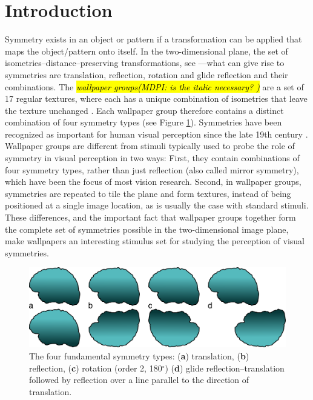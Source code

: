 \documentclass[symmetry,article,accept,pdftex,moreauthors]{Definitions/mdpi}
\begin{document}
\section{Introduction}
Symmetry exists in an object or pattern if a transformation can be applied that maps the object/pattern onto itself. In the two-dimensional plane, the set of isometries--distance--preserving transformations, see \citep{RN1425}---what can give rise to symmetries are translation, reflection, rotation and glide reflection and their combinations. The \textit{\hl{wallpaper groups(MDPI: is the italic necessary?
)}} are a set of 17 regular textures, where each has a unique combination of isometries that leave the texture unchanged \citep{RN1562,RN1563,RN1425}. Each wallpaper group therefore contains a distinct combination of four symmetry types (see Figure \ref{fig:symmetry_types}). Symmetries have been recognized as important for human visual perception since the late 19th century \citep{mach_1959}.  Wallpaper groups are different from stimuli typically used to probe the role of symmetry in visual perception in two ways: First, they contain combinations of four symmetry types, rather than just reflection (also called mirror symmetry), which have been the focus of most vision research. Second, in wallpaper groups, symmetries are repeated to tile the plane and form textures, instead of being positioned at a single image location, as is usually the case with standard stimuli. These differences, and the important fact that wallpaper groups together form the complete set of symmetries possible in the two-dimensional image plane, make wallpapers an interesting stimulus set for studying the perception of visual symmetries.%

\begin{figure}[H]

	\includegraphics[scale=0.6]{./figures/symmetry_types.png}
	\caption{The four fundamental symmetry types: (\textbf{a}) translation, (\textbf{b}) reflection, (\textbf{c}) rotation (order 2, 180$^{\circ}$) (\textbf{d}) glide reflection--translation followed by reflection over a line parallel to the direction of translation. }
	\label{fig:symmetry_types}
\end{figure}
\end{document}
